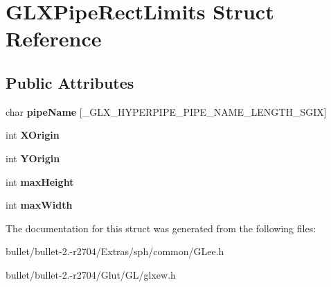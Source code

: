 \hypertarget{struct_g_l_x_pipe_rect_limits}{\section{G\+L\+X\+Pipe\+Rect\+Limits Struct Reference}
\label{struct_g_l_x_pipe_rect_limits}
}
\subsection*{Public Attributes}
\begin{DoxyCompactItemize}
\item 
\hypertarget{struct_g_l_x_pipe_rect_limits_afa45f928361513b3e421bd9eaa1c79c1}{char {\bfseries pipe\+Name} \mbox{[}\+\_\+\+G\+L\+X\+\_\+\+H\+Y\+P\+E\+R\+P\+I\+P\+E\+\_\+\+P\+I\+P\+E\+\_\+\+N\+A\+M\+E\+\_\+\+L\+E\+N\+G\+T\+H\+\_\+\+S\+G\+I\+X\mbox{]}}\label{struct_g_l_x_pipe_rect_limits_afa45f928361513b3e421bd9eaa1c79c1}

\item 
\hypertarget{struct_g_l_x_pipe_rect_limits_a3e5a965059d9f5d2ca42acd35af5bb9b}{int {\bfseries X\+Origin}}\label{struct_g_l_x_pipe_rect_limits_a3e5a965059d9f5d2ca42acd35af5bb9b}

\item 
\hypertarget{struct_g_l_x_pipe_rect_limits_a50e06bcf0dae95854be7d93a515199e9}{int {\bfseries Y\+Origin}}\label{struct_g_l_x_pipe_rect_limits_a50e06bcf0dae95854be7d93a515199e9}

\item 
\hypertarget{struct_g_l_x_pipe_rect_limits_a27572e499c0d3280031c2ad8e387c0c1}{int {\bfseries max\+Height}}\label{struct_g_l_x_pipe_rect_limits_a27572e499c0d3280031c2ad8e387c0c1}

\item 
\hypertarget{struct_g_l_x_pipe_rect_limits_a8662c7a712b30620e25fc994adf337a1}{int {\bfseries max\+Width}}\label{struct_g_l_x_pipe_rect_limits_a8662c7a712b30620e25fc994adf337a1}

\end{DoxyCompactItemize}


The documentation for this struct was generated from the following files\+:\begin{DoxyCompactItemize}
\item 
bullet/bullet-\/2.-\/r2704/\+Extras/sph/common/G\+Lee.\+h\item 
bullet/bullet-\/2.-\/r2704/\+Glut/\+G\+L/glxew.\+h\end{DoxyCompactItemize}
